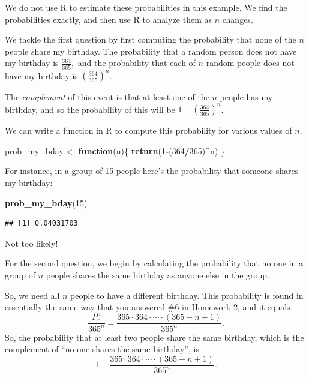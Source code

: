 \documentclass[
]{book}
\newenvironment{Shaded}{\begin{snugshade}}{\end{snugshade}}
\newcommand{\ControlFlowTok}[1]{\textcolor[rgb]{0.13,0.29,0.53}{\textbf{#1}}}
\newcommand{\DecValTok}[1]{\textcolor[rgb]{0.00,0.00,0.81}{#1}}
\newcommand{\FunctionTok}[1]{\textcolor[rgb]{0.13,0.29,0.53}{\textbf{#1}}}
\newcommand{\NormalTok}[1]{#1}
\newcommand{\OtherTok}[1]{\textcolor[rgb]{0.56,0.35,0.01}{#1}}
\newcommand{\SpecialCharTok}[1]{\textcolor[rgb]{0.81,0.36,0.00}{\textbf{#1}}}
\theoremstyle{definition}
\theoremstyle{definition}
\theoremstyle{definition}
\theoremstyle{definition}
\theoremstyle{remark}
\begin{document}
We do not use R to estimate these probabilities in this example. We find the probabilities exactly, and then use R to analyze them as \(n\) changes.

We tackle the first question by first computing the probability that none of the \(n\) people share my birthday. The probability that a random person does not have my birthday is \(\frac{364}{365},\) and the probability that each of \(n\) random people does not have my birthday is \(\left(\frac{364}{365}\right)^n\).

The \emph{complement} of this event is that at least one of the \(n\) people has my birthday, and so the probability of this will be \(1- \left(\frac{364}{365}\right)^n\).

We can write a function in R to compute this probability for various values of \(n\).

\begin{Shaded}
\begin{Highlighting}[]
\NormalTok{prob\_my\_bday }\OtherTok{\textless{}{-}} \ControlFlowTok{function}\NormalTok{(n)\{}
  \FunctionTok{return}\NormalTok{(}\DecValTok{1}\SpecialCharTok{{-}}\NormalTok{(}\DecValTok{364}\SpecialCharTok{/}\DecValTok{365}\NormalTok{)}\SpecialCharTok{\^{}}\NormalTok{n)}
\NormalTok{\}}
\end{Highlighting}
\end{Shaded}

For instance, in a group of 15 people here's the probability that someone shares my birthday:

\begin{Shaded}
\begin{Highlighting}[]
\FunctionTok{prob\_my\_bday}\NormalTok{(}\DecValTok{15}\NormalTok{)}
\end{Highlighting}
\end{Shaded}

\begin{verbatim}
## [1] 0.04031703
\end{verbatim}

Not too likely!

For the second question, we begin by calculating the probability that no one in a group of \(n\) people shares the same birthday as anyone else in the group.

So, we need all \(n\) people to have a different birthday. This probability is found in essentially the same way that you answered \#6 in Homework 2, and it equals
\[\frac{P^n_r}{365^n}=\frac{365\cdot 364 \cdot \cdots \cdot (365-n+1)}{365^n}.\]
So, the probability that at least two people share the same birthday, which is the complement of ``no one shares the same birthday'', is \[1 - \frac{365\cdot 364 \cdot \cdots \cdot (365-n+1)}{365^n}.\]
\end{document}
